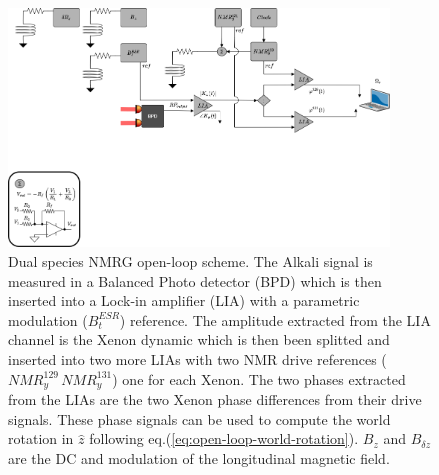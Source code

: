 \documentclass{article}
\begin{document}
\begin{figure}[h]
\centering
\includegraphics[width=0.9\textwidth]{Theory/Figures/NMRG_open_loop_scheme.png}
\caption{Dual species NMRG open-loop scheme. The Alkali signal is measured in a Balanced Photo detector (BPD) which is then inserted into a Lock-in amplifier (LIA) with a parametric modulation ($B^{ESR}_t$) reference. The amplitude extracted from the LIA channel is the Xenon dynamic which is then been splitted and inserted into two more LIAs with two NMR drive references ($NMR^{129}_y\,NMR^{131}_y$) one for each Xenon. The two phases extracted from the LIAs are the two Xenon phase differences from their drive signals. These phase signals can be used to compute the world rotation in $\hat{z}$ following eq.(\ref{eq:open-loop-world-rotation}). $B_z$ and $B_{\delta z}$ are the DC and modulation of the longitudinal magnetic field.}
\label{fig:open_loop_scheme}
\end{figure}
\end{document}
